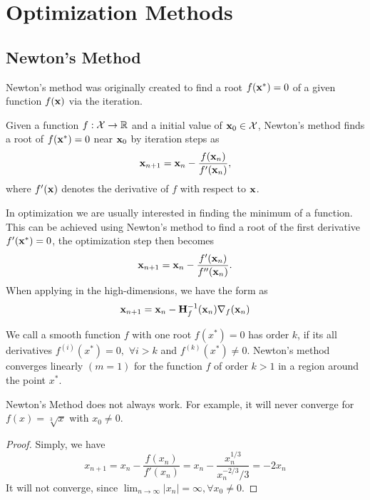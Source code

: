 \section{Optimization Methods}
\subsection{Newton's Method}
Newton’s method was originally created to find a root $f(\mathbf{x}^*) = 0$ of a given function $f(\mathbf{x})$ via the iteration.
\begin{definition} Given a function $f: \mathcal{X} \rightarrow \mathbb{R}$ and a initial value of $\mathbf{x}_0 \in \mathcal{X}$, Newton’s method finds a root of $f(\mathbf{x}^*) = 0$ near $\mathbf{x}_0$ by iteration steps as
$$
	\mathbf{x}_{n+1} = \mathbf{x}_n - \frac{f(\mathbf{x}_n)}{f'(\mathbf{x}_n)},
$$
where $f'(\mathbf{x})$ denotes the derivative of $f$ with respect to $\mathbf{x}$.
\end{definition}
In optimization we are usually interested in finding the minimum of a function. This can be achieved using Newton’s method to find a root of the first derivative $f'(\mathbf{x}^*) = 0$, the optimization step then becomes
\begin{equation}
	\mathbf{x}_{n+1} = \mathbf{x}_n - \frac{f'(\mathbf{x}_n)}{f''(\mathbf{x}_n)}.
\end{equation}
When applying in the high-dimensions, we have the form as
	\begin{align}
		\mathbf{x}_{n + 1} = \mathbf{x}_{n} -\mathbf{H}_f^{-1}(\mathbf{x}_{n}) \nabla_f(\mathbf{x}_{n})
	\end{align}

\begin{property}  We call a smooth function $f$ with one root $f(x^*) = 0$ has order $k$, if its all derivatives $f^{(i)}(x^*) = 0,$ $\forall i > k$ and $f^{(k)}(x^*) \neq 0$.
	 Newton’s method converges linearly $(m = 1)$ for the function $f$ of order $k > 1$ in a region around the point $x^*$.
\end{property}

\begin{property} Newton's Method does not always work.  For example, it will never converge for $f(x) = \sqrt[3]{x}$ with $x_0 \neq 0$.
\end{property}
\begin{proof}
	Simply, we have
	\begin{equation}
		x_{n+1} = x_n - \frac{f(x_n)}{f'(x_n)} = x_n - \frac{x_n^{1/3}}{x_n^{-2/3} / 3} = -2x_n
	\end{equation}
	It will not converge, since $\lim_{n\rightarrow \infty} |x_n| = \infty, \forall x_0 \neq 0$.
\end{proof}

